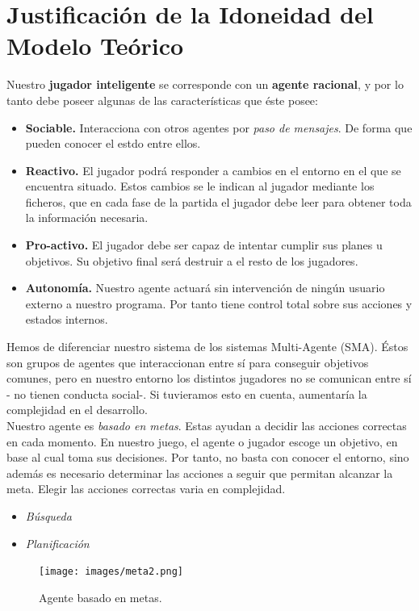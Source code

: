 \documentclass[a4paper,12pt,oneside]{book}
\begin{document}
\chapter{Justificación de la Idoneidad del Modelo Teórico}


Nuestro {\bf jugador inteligente} se corresponde con un {\bf agente racional}, y
por lo tanto debe poseer algunas de las características que éste posee:
\begin{itemize}
\item {\bf Sociable.} Interacciona con otros agentes por {\it paso de
    mensajes}. De forma que pueden conocer el estdo entre ellos.
\item {\bf Reactivo.} El jugador podrá responder a cambios en el
  entorno en el que se encuentra situado. Estos cambios se le indican
  al jugador mediante los ficheros, que en cada fase de la partida el
  jugador debe leer para obtener toda la información necesaria.
\item {\bf Pro-activo.} El jugador debe ser capaz de intentar cumplir
  sus planes u objetivos. Su objetivo final será destruir a el resto
  de los jugadores.
\item {\bf Autonomía.} Nuestro agente actuará sin intervención de
  ningún usuario externo a nuestro programa. Por tanto tiene control
  total sobre sus acciones y estados internos.
\end{itemize}



Hemos de diferenciar nuestro sistema de los sistemas Multi-Agente
(SMA). Éstos son grupos de agentes que interaccionan entre sí para
conseguir objetivos comunes, pero en nuestro entorno los distintos
jugadores no se comunican entre sí - no tienen conducta social-. Si
tuvieramos esto en cuenta, aumentaría la complejidad en el
desarrollo.\\

Nuestro agente es {\it basado en metas}. Estas ayudan a decidir las acciones
correctas en cada momento. En nuestro juego, el agente o jugador
escoge un objetivo, en base al cual toma sus decisiones. Por tanto, no
basta con conocer el entorno, sino además es necesario determinar las
acciones a seguir que permitan alcanzar la meta. Elegir las acciones
correctas varia en complejidad.
\begin{itemize}
\item {\it Búsqueda}
\item {\it Planificación}
\end{itemize}
\begin{figure}[!h]
  \centering
  \texttt{[image: images/meta2.png]}
  \caption{Agente basado en metas.}
\end{figure}
\end{document}
